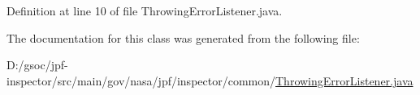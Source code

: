 Definition at line 10 of file Throwing\+Error\+Listener.\+java.



The documentation for this class was generated from the following file\+:\begin{DoxyCompactItemize}
\item 
D\+:/gsoc/jpf-\/inspector/src/main/gov/nasa/jpf/inspector/common/\hyperlink{_throwing_error_listener_8java}{Throwing\+Error\+Listener.\+java}\end{DoxyCompactItemize}
